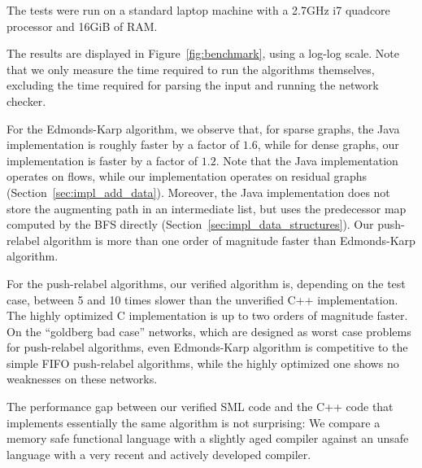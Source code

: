 \documentclass[smallcondensed]{svjour3}     %
\begin{document}
  The tests were run on a standard laptop machine with a 2.7GHz i7 quadcore processor and 16GiB of RAM.
  
  The results are displayed in Figure~\ref{fig:benchmark}, using a log-log scale.
  Note that we only measure the time required to run the algorithms themselves, excluding the time required for parsing the input and running the network checker.
  
  For the Edmonds-Karp algorithm, we observe that, for sparse graphs, the Java implementation is roughly faster by a factor of $1.6$, while for dense graphs, 
  our implementation is faster by a factor of $1.2$. Note that the Java implementation operates on flows, while our implementation 
  operates on residual graphs (\cf Section~\ref{sec:impl_add_data}). Moreover, the Java implementation does not store the augmenting 
  path in an intermediate list, but uses the predecessor map computed by the BFS directly (\cf Section~\ref{sec:impl_data_structures}).
  Our push-relabel algorithm is more than one order of magnitude faster than Edmonds-Karp algorithm.
  
  For the push-relabel algorithms, our verified algorithm is, depending on the test case, between 5 and 10 times slower than the unverified C++ implementation.
  The highly optimized C implementation is up to two orders of magnitude faster. 
  On the ``goldberg bad case'' networks, which are designed as worst case problems for push-relabel algorithms, 
  even Edmonds-Karp algorithm is competitive to the simple FIFO push-relabel algorithms, while the highly optimized one shows no weaknesses on these networks.
  
  The performance gap between our verified SML code and the C++ code that implements essentially the same algorithm is not surprising: We compare a 
  memory safe functional language with a slightly aged compiler against an unsafe language with a very recent and actively developed compiler.
  
\end{document}

